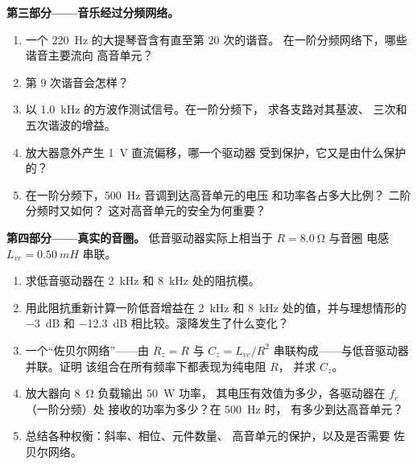 \begin{problem}
\medskip
\noindent\textbf{第三部分——音乐经过分频网络。}
\begin{enumerate}[resume]
  \item 一个 \qty{220}{Hz} 的大提琴音含有直至第 20 次的谐音。
        在一阶分频网络下，哪些谐音主要流向
        高音单元？
  \item 第 9 次谐音会怎样？
  \item 以 \qty{1.0}{kHz} 的方波作测试信号。在一阶分频下，
        求各支路对其基波、
        三次和五次谐波的增益。
  \item 放大器意外产生 \qty{1}{V} 直流偏移，哪一个驱动器
        受到保护，它又是由什么保护的？
  \item 在一阶分频下，\qty{500}{Hz} 音调到达高音单元的电压
        和功率各占多大比例？
        二阶分频时又如何？
        这对高音单元的安全为何重要？
\end{enumerate}

\medskip
\noindent\textbf{第四部分——真实的音圈。}
低音驱动器实际上相当于 $R = \qty{8.0}{\ohm}$ 与音圈
电感 $L_{vc} = \qty{0.50}{mH}$ 串联。
\begin{enumerate}[resume]
  \item 求低音驱动器在 \qty{2}{kHz} 和
        \qty{8}{kHz} 处的阻抗模。
  \item 用此阻抗重新计算一阶低音增益在 \qty{2}{kHz} 和
        \qty{8}{kHz} 处的值，并与理想情形的
        \qty{-3}{dB} 和 \qty{-12.3}{dB} 相比较。滚降发生了什么变化？
  \item 一个“佐贝尔网络”——由 $R_z = R$ 与 $C_z =
        L_{vc}/R^2$ 串联构成——与低音驱动器并联。证明
        该组合在所有频率下都表现为纯电阻 $R$，
        并求 $C_z$。
  \item 放大器向 \qty{8}{\ohm} 负载输出 \qty{50}{W} 功率，
        其电压有效值为多少，各驱动器在 $f_c$（一阶分频）处
        接收的功率为多少？在 \qty{500}{Hz} 时，
        有多少到达高音单元？
  \item 总结各种权衡：斜率、相位、元件数量、
        高音单元的保护，以及是否需要 佐贝尔网络。
\end{enumerate}
\end{problem}
